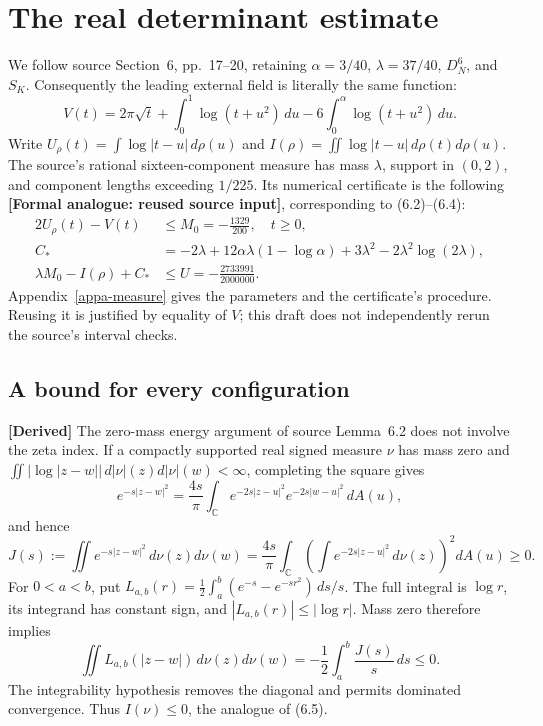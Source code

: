 \section{The real determinant estimate}
\label{s6-real}

We follow source Section~6, pp.~17--20, retaining $\alpha=3/40$,
$\lambda=37/40$, $D_N^6$, and $S_K$.  Consequently the leading external
field is literally the same function:
\begin{equation}
 V(t)=2\pi\sqrt t+\int_0^1\log(t+u^2)\,du
             -6\int_0^\alpha\log(t+u^2)\,du.
 \label{s6-field}
\end{equation}
Write $U_\rho(t)=\int\log|t-u|\,d\rho(u)$ and
$I(\rho)=\iint\log|t-u|\,d\rho(t)d\rho(u)$.  The source's rational
sixteen-component measure has mass $\lambda$, support in $(0,2)$, and
component lengths exceeding $1/225$.  Its numerical certificate is the
following \textbf{[Formal analogue: reused source input]}, corresponding
to (6.2)--(6.4):
\begin{align}
 2U_\rho(t)-V(t)&\le M_0=-\frac{1329}{200},\quad t\ge0,
 \label{s6-potential}\\
 C_*&=-2\lambda+12\alpha\lambda(1-\log\alpha)
          +3\lambda^2-2\lambda^2\log(2\lambda),\\
 \lambda M_0-I(\rho)+C_*&\le U=-\frac{2733991}{2000000}.
 \label{s6-source-constant}
\end{align}
Appendix~\ref{appa-measure} gives the parameters and the certificate's
procedure.  Reusing it is justified by equality of $V$; this draft does
not independently rerun the source's interval checks.

\subsection{A bound for every configuration}

\textbf{[Derived]} The zero-mass energy argument of source Lemma~6.2
does not involve the zeta index.  If a compactly supported real signed
measure $\nu$ has mass zero and
$\iint|\log|z-w||\,d|\nu|(z)d|\nu|(w)<\infty$, completing the square gives
\[
 e^{-s|z-w|^2}=\frac{4s}{\pi}\int_{\mathbb C}
 e^{-2s|z-u|^2}e^{-2s|w-u|^2}\,dA(u),
\]
and hence
\[
 J(s):=\iint e^{-s|z-w|^2}\,d\nu(z)d\nu(w)
 =\frac{4s}{\pi}\int_{\mathbb C}
       \left(\int e^{-2s|z-u|^2}\,d\nu(z)\right)^2dA(u)\ge0.
\]
For $0<a<b$, put
$L_{a,b}(r)=\tfrac12\int_a^b(e^{-s}-e^{-sr^2})\,ds/s$.
The full integral is $\log r$, its integrand has constant sign, and
$|L_{a,b}(r)|\le|\log r|$.  Mass zero therefore implies
\[
 \iint L_{a,b}(|z-w|)\,d\nu(z)d\nu(w)
       =-\frac12\int_a^b\frac{J(s)}s\,ds\le0.
\]
The integrability hypothesis removes the diagonal and permits dominated
convergence.  Thus $I(\nu)\le0$, the analogue of (6.5).

